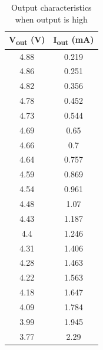 \documentclass[12pt]{article}
\begin{document}
   
  

\begin{table}[t]
\centering  %
\begin{tabular}{|c | c |}                                                             
\hline  %
V\textsubscript{out} (V) & I\textsubscript{out} (mA) \\  %
\hline  %
4.88 &	0.219\\
4.86 &	0.251\\
4.82 &	0.356\\
4.78 &	0.452\\
4.73 &	0.544\\
4.69 &	0.65\\
4.66 &	0.7\\
4.64 &	0.757\\
4.59 &	0.869\\
4.54 &	0.961\\
4.48 &	1.07\\
4.43 &	1.187\\
4.4	  &   1.246\\
4.31 &	1.406\\
4.28 &	1.463\\
4.22 &	1.563\\
4.18 &	1.647\\
4.09 &	1.784\\
3.99 &	1.945\\
3.77 &	2.29\\


\hline  %
\end{tabular}
\caption{Output characteristics when output is high}
\label{table:demotable}
\end{table}
\end{document}
